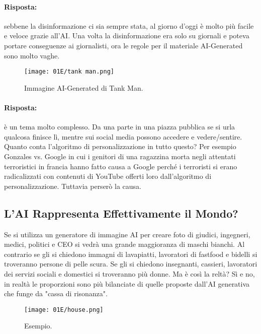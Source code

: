 

\paragraph{Risposta:} sebbene la disinformazione ci sia sempre stata, al giorno d'oggi è molto più facile e veloce grazie all'AI. Una volta la disinformazione era solo su giornali e poteva portare conseguenze ai giornalisti, ora le regole per il materiale AI-Generated sono molto vaghe. 

\begin{figure}[h]
    \centering
    \texttt{[image: 01E/tank man.png]}
    \caption{Immagine AI-Generated di Tank Man.}
\end{figure}


\paragraph{Risposta:} è un tema molto complesso. Da una parte in una piazza pubblica se si urla qualcosa finisce lì, mentre sui social media  possono accedere e vedere/sentire. Quanto conta l'algoritmo di personalizzazione in tutto questo? Per esempio Gonzales vs. Google in cui i genitori di una ragazzina morta negli attentati terroristici in francia hanno fatto causa a Google perché i terroristi si erano radicalizzati con contenuti di YouTube offerti loro dall'algoritmo di personalizzazione. Tuttavia perserò la causa.

\subsection{L'AI Rappresenta Effettivamente il Mondo?}

Se si utilizza un generatore di immagine AI per creare foto di giudici, ingegneri, medici, politici e CEO si vedrà una grande maggioranza di maschi bianchi. Al contrario se gli si chiedono immagni di lavapiatti, lavoratori di fastfood e bidelli si troveranno persone di pelle scura. Se gli si chiedono insegnanti, cassieri, lavoratori dei servizi sociali e domestici si troveranno più donne. Ma è così la reltà? Sì e no, in realtà le proporzioni sono più bilanciate di quelle proposte dall'AI generativa che funge da "cassa di risonanza".
\begin{figure}[h]
    \centering
    \texttt{[image: 01E/house.png]}
    \caption{Esempio.}
\end{figure}


